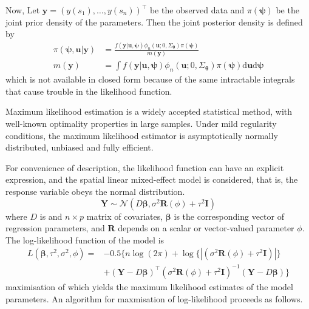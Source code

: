 \documentclass[12pt,a4paper,UTF8,twoside]{book}
\begin{document}
Now, Let \(\mathbf{y} = (y(s_1),\ldots,y(s_n))^{\top}\) be the observed
data and \(\pi(\boldsymbol{\psi})\) be the joint prior density of the
parameters. Then the joint posterior density is defined by
\begin{equation}
\begin{aligned}
\pi(\boldsymbol{\psi},\mathbf{u}|\mathbf{y}) &= \frac{f(\mathbf{y|\mathbf{u}, \boldsymbol{\psi}})\phi_{n}(\mathbf{u};0,\Sigma_{\boldsymbol{\theta}})\pi(\boldsymbol{\psi})}{m(\mathbf{y})} \\
m(\mathbf{y}) &= \int f(\mathbf{y|\mathbf{u}, \boldsymbol{\psi}})\phi_{n}(\mathbf{u};0,\Sigma_{\boldsymbol{\theta}})\pi(\boldsymbol{\psi})\mathrm{d} \mathbf{u} \mathrm{d} \boldsymbol{\psi}
\end{aligned}
\end{equation} \noindent which is not available in closed form because
of the same intractable integrals that cause trouble in the likelihood
function.

Maximum likelihood estimation is a widely accepted statistical method,
with well-known optimality properties in large samples. Under mild
regularity conditions, the maximum likelihood estimator is
asymptotically normally distributed, unbiased and fully efficient.

For convenience of description, the likelihood function can have an
explicit expression, and the spatial linear mixed-effect model is
considered, that is, the response variable obeys the normal
distribution. \begin{equation}
\mathbf{Y} \sim \mathcal{N}(D\boldsymbol{\beta},\sigma^2 \mathbf{R}(\phi) + \tau^2\mathbf{I})
\label{eq:gaussian-model-en}
\end{equation} \noindent where \(D\) is and \(n \times p\) matrix of
covariates, \(\boldsymbol{\beta}\) is the corresponding vector of
regression parameters, and \(\mathbf{R}\) depends on a scalar or
vector-valued parameter \(\phi\). The log-likelihood function of the
model is \begin{equation}
\begin{aligned}
L(\boldsymbol{\beta},\tau^2,\sigma^2,\phi) = {} 
 & - 0.5\{ n\log(2\pi) + \log\{|(\sigma^2\mathbf{R}(\phi)+\tau^2\mathbf{I})|\} \\
 & + (\mathbf{Y} - D\boldsymbol{\beta})^{\top}(\sigma^2\mathbf{R}(\phi)+\tau^2\mathbf{I})^{-1}(\mathbf{Y} - D\boldsymbol{\beta}) \}  
\end{aligned} \label{eq:gauss-log-lik-en}
\end{equation} \noindent maximisation of which yields the maximum
likelihood estimates of the model parameters. An algorithm for
maxmisation of log-likelihood proceeds as follows.
\end{document}
